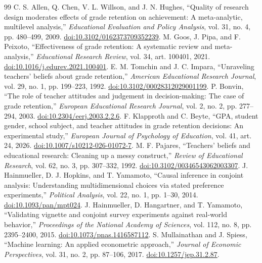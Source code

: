 \begin{thebibliography}{99}\small
{} C. S. Allen, Q. Chen, V. L. Willson, and J. N. Hughes, ``Quality of research design moderates effects of grade retention on achievement: A meta-analytic, multilevel analysis,'' \textit{Educational Evaluation and Policy Analysis}, vol. 31, no. 4, pp. 480--499, 2009. \href{https://doi.org/10.3102/0162373709352239}{doi:10.3102/0162373709352239}.
 M. Goos, J. Pipa, and F. Peixoto, ``Effectiveness of grade retention: A systematic review and meta-analysis,'' \textit{Educational Research Review}, vol. 34, art. 100401, 2021. \href{https://doi.org/10.1016/j.edurev.2021.100401}{doi:10.1016/j.edurev.2021.100401}.
 E. M. Tomchin and J. C. Impara, ``Unraveling teachers' beliefs about grade retention,'' \textit{American Educational Research Journal}, vol. 29, no. 1, pp. 199--223, 1992. \href{https://doi.org/10.3102/00028312029001199}{doi:10.3102/00028312029001199}.
 P. Bonvin, ``The role of teacher attitudes and judgement in decision-making: The case of grade retention,'' \textit{European Educational Research Journal}, vol. 2, no. 2, pp. 277--294, 2003. \href{https://doi.org/10.2304/eerj.2003.2.2.6}{doi:10.2304/eerj.2003.2.2.6}.
 F. Klapproth and C. Beyte, ``GPA, student gender, school subject, and teacher attitudes in grade retention decisions: An experimental study,'' \textit{European Journal of Psychology of Education}, vol. 41, art. 24, 2026. \href{https://doi.org/10.1007/s10212-026-01072-7}{doi:10.1007/s10212-026-01072-7}.
 M. F. Pajares, ``Teachers' beliefs and educational research: Cleaning up a messy construct,'' \textit{Review of Educational Research}, vol. 62, no. 3, pp. 307--332, 1992. \href{https://doi.org/10.3102/00346543062003307}{doi:10.3102/00346543062003307}.
 J. Hainmueller, D. J. Hopkins, and T. Yamamoto, ``Causal inference in conjoint analysis: Understanding multidimensional choices via stated preference experiments,'' \textit{Political Analysis}, vol. 22, no. 1, pp. 1--30, 2014. \href{https://doi.org/10.1093/pan/mpt024}{doi:10.1093/pan/mpt024}.
 J. Hainmueller, D. Hangartner, and T. Yamamoto, ``Validating vignette and conjoint survey experiments against real-world behavior,'' \textit{Proceedings of the National Academy of Sciences}, vol. 112, no. 8, pp. 2395--2400, 2015. \href{https://doi.org/10.1073/pnas.1416587112}{doi:10.1073/pnas.1416587112}.
 S. Mullainathan and J. Spiess, ``Machine learning: An applied econometric approach,'' \textit{Journal of Economic Perspectives}, vol. 31, no. 2, pp. 87--106, 2017. \href{https://doi.org/10.1257/jep.31.2.87}{doi:10.1257/jep.31.2.87}.

\end{thebibliography}
